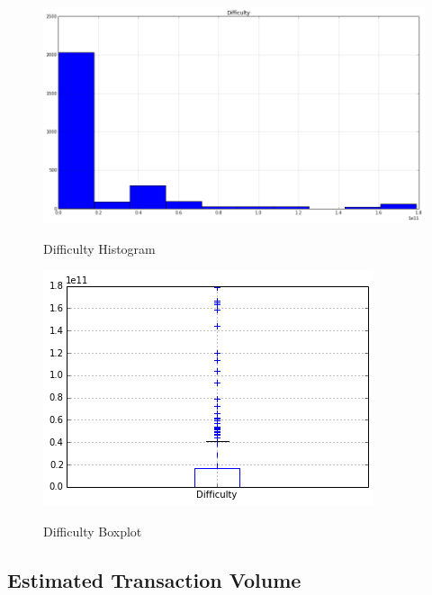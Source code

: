 \begin{figure}[bth]
  \myfloatalign
  {\includegraphics[width=1\linewidth]
    {gfx/difficulty-histogram}}
  \caption{Difficulty Histogram}
  \label{fig:difficulty-histogram}
\end{figure}

\begin{figure}[bth]
  \myfloatalign
  {\includegraphics[width=1\linewidth]
    {gfx/difficulty-boxplot}}
  \caption{Difficulty Boxplot}
  \label{fig:difficulty-boxplot}
\end{figure}

\clearpage

\subsection{Estimated Transaction Volume}
\label{sec:estimated-transaction-volume}

